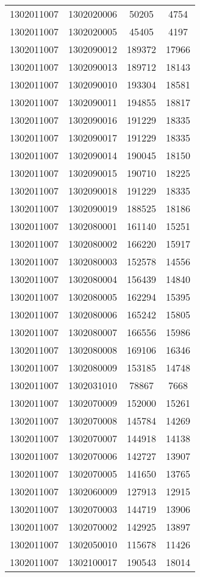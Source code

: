 \begin{longtable}{llcc}
1302011007 & 1302020006 & 50205 & 4754\\
1302011007 & 1302020005 & 45405 & 4197\\
1302011007 & 1302090012 & 189372 & 17966\\
1302011007 & 1302090013 & 189712 & 18143\\
1302011007 & 1302090010 & 193304 & 18581\\
1302011007 & 1302090011 & 194855 & 18817\\
1302011007 & 1302090016 & 191229 & 18335\\
1302011007 & 1302090017 & 191229 & 18335\\
1302011007 & 1302090014 & 190045 & 18150\\
1302011007 & 1302090015 & 190710 & 18225\\
1302011007 & 1302090018 & 191229 & 18335\\
1302011007 & 1302090019 & 188525 & 18186\\
1302011007 & 1302080001 & 161140 & 15251\\
1302011007 & 1302080002 & 166220 & 15917\\
1302011007 & 1302080003 & 152578 & 14556\\
1302011007 & 1302080004 & 156439 & 14840\\
1302011007 & 1302080005 & 162294 & 15395\\
1302011007 & 1302080006 & 165242 & 15805\\
1302011007 & 1302080007 & 166556 & 15986\\
1302011007 & 1302080008 & 169106 & 16346\\
1302011007 & 1302080009 & 153185 & 14748\\
1302011007 & 1302031010 & 78867 & 7668\\
1302011007 & 1302070009 & 152000 & 15261\\
1302011007 & 1302070008 & 145784 & 14269\\
1302011007 & 1302070007 & 144918 & 14138\\
1302011007 & 1302070006 & 142727 & 13907\\
1302011007 & 1302070005 & 141650 & 13765\\
1302011007 & 1302060009 & 127913 & 12915\\
1302011007 & 1302070003 & 144719 & 13906\\
1302011007 & 1302070002 & 142925 & 13897\\
1302011007 & 1302050010 & 115678 & 11426\\
1302011007 & 1302100017 & 190543 & 18014\\

\end{longtable}
